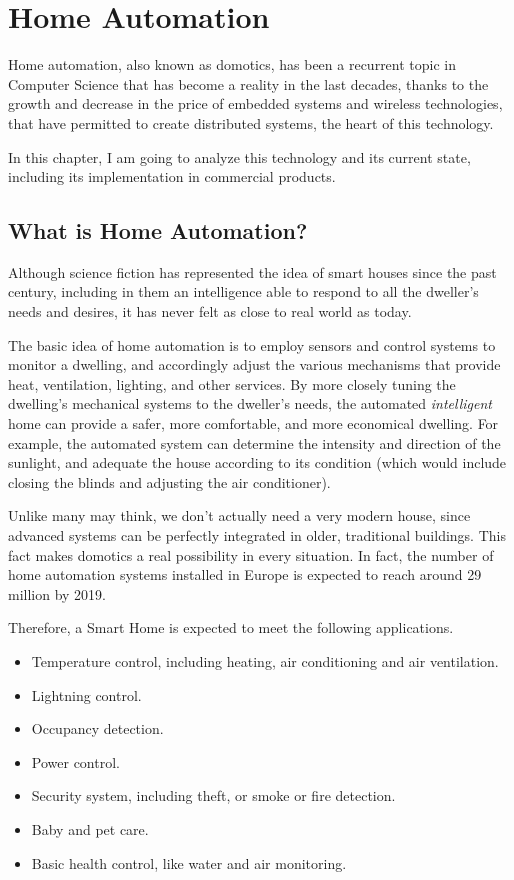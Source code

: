 \chapter{Home Automation}

Home automation, also known as domotics, has been a recurrent topic in Computer Science that
has become a reality in the last decades, thanks to the growth and decrease in the price of embedded
systems and wireless technologies, that have permitted to create distributed systems, the heart of this technology.

In this chapter, I am going to analyze this technology and its current state, including its implementation in commercial
products.

\section{What is Home Automation?}
Although science fiction has represented the idea of smart houses since the past century, including in them
an intelligence able to respond to all the dweller’s needs and desires, it has never felt as close to real world as today.

The basic idea of home automation is to employ sensors and control systems to monitor a dwelling, and accordingly 
adjust the various mechanisms that provide heat, ventilation, lighting, and other services. By more closely tuning the 
dwelling’s mechanical systems to the dweller’s needs, the automated \textit{intelligent} home can provide a safer, more 
comfortable, and more economical dwelling.\cite{smarthouse98} For example, the automated system can determine 
the intensity and direction of the sunlight, and adequate the house according to its condition (which would include
closing the blinds and adjusting the air conditioner).

Unlike many may think, we don't actually need a very modern house, since advanced systems can be perfectly integrated 
in older, traditional buildings. This fact makes domotics a real possibility in every situation. In fact, the number of home 
automation systems installed in Europe is expected to reach around 29 million by 2019.\cite{statistaInstalled}

Therefore, a Smart Home is expected to meet the following applications.
\begin{itemize}
	\item Temperature control, including heating, air conditioning and air ventilation.
	\item Lightning control.
	\item Occupancy detection.
	\item Power control.
	\item Security system, including theft, or smoke or fire detection.
	\item Baby and pet care.
	\item Basic health control, like water and air monitoring.
\end{itemize}

